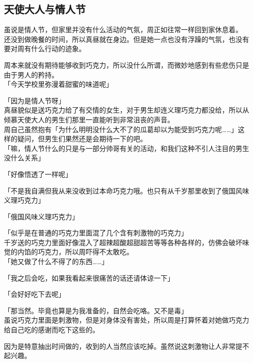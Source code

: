 \subsection{天使大人与情人节}

虽说是情人节，但家里并没有什么活动的气氛，周正如往常一样回到家休息着。\\

还没到做晚餐的时间，所以真昼就在身边。但是她一点也没有浮躁的气氛，也没有要对周有什么行动的迹象。

周本来就没有期待能够收到巧克力，所以没什么所谓，而微妙地感到有些悲伤只是由于男人的矜持。\\

「今天学校里弥漫着甜蜜的味道呢」

「因为是情人节呀」\\

真昼貌似是送巧克力给了有交情的女生，对于男生却连义理巧克力都没给，所以从倾慕天使大人的男生们那里一直能听到非常沮丧的声音。\\

周自己虽然抱有「为什么明明没什么大不了的瓜葛却以为能受到巧克力呢……」这样的疑问，但男生们果然还是会期待一下的吧。\\

「嘛，情人节什么的只是与一部分帅哥有关的活动，和我们这种不引人注目的男生没什么关系」

「好像悟透了一样呢」

「不是我自满但我从来没收到过本命巧克力哦。也只有从千岁那里收到了俄国风味义理巧克力」

「俄国风味义理巧克力」

「似乎是在普通的巧克力里面混了几个含有刺激物的巧克力」\\

千岁送的巧克力里面好像混入了超辣超酸超甜超苦等等各种各样的，仿佛会破坏味觉的内馅的巧克力，所以周吓得不太敢吃。\\

「她又做了什么不得了的东西……」

「我之后会吃，如果我看起来很痛苦的话还请体谅一下」

「会好好吃下去呢」

「那当然。毕竟也算是为我准备的，自然会吃咯。又不是毒」\\

虽说巧克力里面是刺激物，但是对身体没有害处，所以周是打算怀着对她做巧克力给自己吃的感谢而吃下这些的。

因为是特意抽出时间做的，收到的人当然应该吃掉。虽然说这刺激物让人非常提不起兴趣。\\


